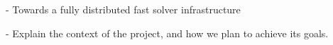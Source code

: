 - Towards a fully distributed fast solver infrastructure

- Explain the context of the project, and how we plan to achieve its goals. 
